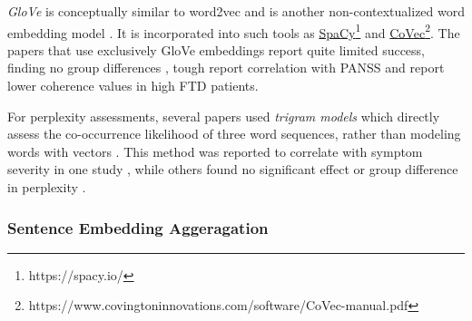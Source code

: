 
\textit{GloVe} is conceptually similar to word2vec and is another non-contextualized word embedding model \citep{pennington2014glove}. It is incorporated into such tools as \href{https://spacy.io/}{SpaCy}\footnote{https://spacy.io/} and \href{https://www.covingtoninnovations.com/software/CoVec-manual.pdf}{CoVec}\footnote{https://www.covingtoninnovations.com/software/CoVec-manual.pdf}. The papers that use exclusively GloVe embeddings report quite limited success, finding no group differences \citep{just2020modeling, alonso2022language, alonso2022progressive}, tough \citet{alonso2022progressive} report correlation with PANSS and \citet{just2020modeling} report lower coherence values in high FTD patients.

For perplexity assessments, several papers used \textit{trigram	models} which directly assess the co-occurrence likelihood of three word sequences, rather than modeling words with vectors \citep{mitchell2015quantifying, vail2018toward, girard2022computational}. This method was reported to correlate with symptom severity in one study \citep{vail2018toward}, while others found no significant effect \citep{girard2022computational} or group difference in perplexity \citep{mitchell2015quantifying}.


\subsubsection{Sentence Embedding Aggeragation}

